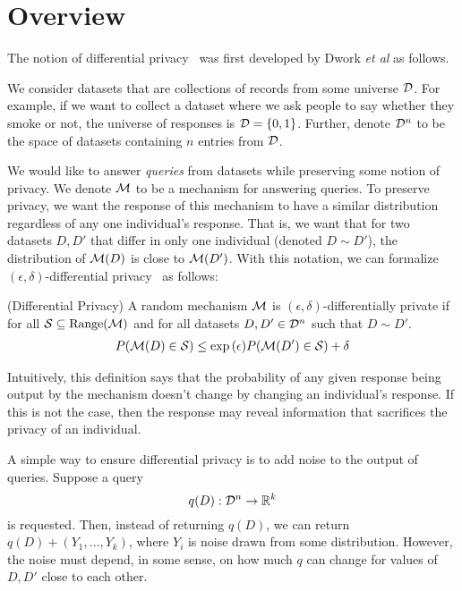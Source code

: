 \documentclass{article} %
\begin{document}
\section{Overview}\label{overview}
The notion of differential privacy~\cite{dwork2006calibrating} was first
developed by Dwork \emph{et al} as follows.


We consider datasets that are collections of records from some universe $\mathcal{D}$.
For example, if we want to collect a dataset where we ask people to say whether
they smoke or not, the universe of responses is $\mathcal{D} = \{0, 1\}$. Further,
denote $\mathcal{D}^n$ to be the space of datasets containing $n$ entries from $\mathcal{D}$.

We would like to answer \textit{queries} from datasets while preserving some
notion of privacy. We denote $\mathcal{M}$ to be a mechanism for answering
queries. To preserve privacy, we want the response of this mechanism
to have a similar distribution regardless of any one individual's response.
That is, we want that for two datasets $D, D'$ that differ in only one
individual (denoted $D \sim D'$), the distribution of $\mathcal{M}(D)$ is close to
$\mathcal{M}(D')$. With this notation, we can formalize $(\epsilon,
\delta)$-differential privacy~\cite{dwork2014algorithmic} as follows:

\begin{definition}{(Differential Privacy)}
A random mechanism $\mathcal{M}$ is $(\epsilon, \delta)$-differentially private
if for all $\mathcal{S} \subseteq \textup{Range}(\mathcal{M})$ and for all
datasets $D, D' \in \mathcal{D}^n$ such that $D \sim D'$.
\begin{align*}
P(\mathcal{M}(D) \in \mathcal{S}) \leq \exp{(\epsilon)} P(\mathcal{M}(D') \in \mathcal{S}) + \delta
\end{align*}
\end{definition}

Intuitively, this definition says that the probability of any given response
being output by the mechanism doesn't change by changing an individual's
response. If this is not the case, then the response may reveal information that
sacrifices the privacy of an individual.

A simple way to ensure differential privacy is to add noise to the
output of queries. Suppose a query
\[ q(D) : \mathcal{D}^n \rightarrow \mathbb{R}^k \]
is requested. Then, instead of returning $q(D)$, we can return
$q(D) + (Y_1, \dots, Y_k)$, where $Y_i$ is noise drawn from some distribution.
However, the noise must depend, in some sense, on how much $q$ can change for
values of $D, D'$ close to each other.
\end{document}
